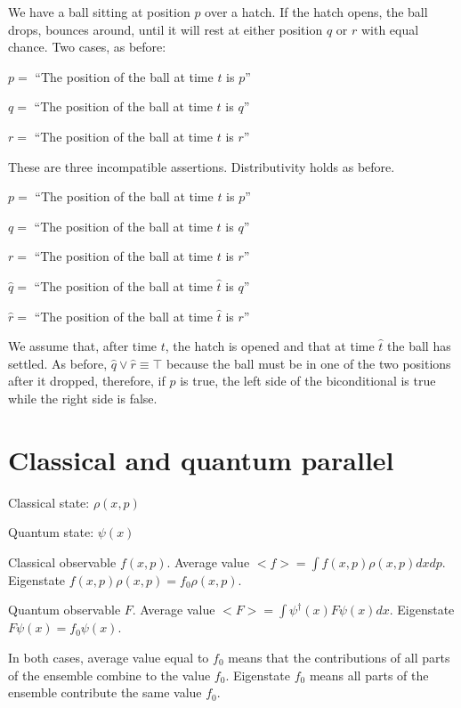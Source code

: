 \documentclass[10pt,twocolumn, nofootinbib]{revtex4-1}
\begin{document}
We have a ball sitting at position $p$ over a hatch. If the hatch opens, the ball drops, bounces around, until it will rest at either position $q$ or $r$ with equal chance. Two cases, as before:

\begin{description}
    \item $p =$ ``The position of the ball at time $t$ is $p$''
    \item $q =$ ``The position of the ball at time $t$ is $q$''
    \item $r =$ ``The position of the ball at time $t$ is $r$''
\end{description}

These are three incompatible assertions. Distributivity holds as before.

\begin{description}
    \item $p =$ ``The position of the ball at time $t$ is $p$''
    \item $q =$ ``The position of the ball at time $t$ is $q$''
    \item $r =$ ``The position of the ball at time $t$ is $r$''
    \item $\hat{q} =$ ``The position of the ball at time $\hat{t}$ is $q$''
    \item $\hat{r} =$ ``The position of the ball at time $\hat{t}$ is $r$''
\end{description}

We assume that, after time $t$, the hatch is opened and that at time $\hat{t}$ the ball has settled. As before, $\hat{q} \vee \hat{r} \equiv \top$ because the ball must be in one of the two positions after it dropped, therefore, if $p$ is true, the left side of the biconditional is true while the right side is false.

\section{Classical and quantum parallel}

Classical state: $\rho(x,p)$

Quantum state: $\psi(x)$

Classical observable $f(x,p)$. Average value $<f> = \int f(x, p) \rho(x, p) dx dp$. Eigenstate $f(x, p) \rho(x, p) = f_0 \rho(x, p)$.

Quantum observable $F$. Average value $<F> = \int \psi^\dagger(x) F \psi(x) dx$. Eigenstate $F \psi(x) = f_0 \psi(x)$.

In both cases, average value equal to $f_0$ means that the contributions of all parts of the ensemble combine to the value $f_0$. Eigenstate $f_0$ means all parts of the ensemble contribute the same value $f_0$.
\end{document}
